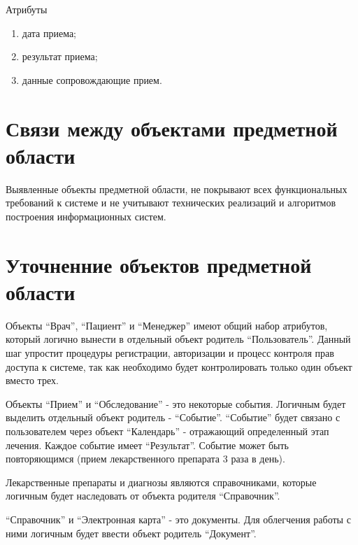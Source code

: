 Атрибуты
\begin{enumerate}
  \item дата приема; 
  \item результат приема; 
  \item данные сопровождающие прием. 
\end{enumerate}

\section{Связи между объектами предметной области}
Выявленные объекты предметной области, не покрывают всех функциональных
требований к системе и не учитывают технических реализаций и алгоритмов
построения информационных систем.

\section{Уточненние объектов предметной области}
Объекты “Врач”, “Пациент” и “Менеджер” имеют общий набор атрибутов, который
логично вынести в отдельный объект родитель “Пользователь”. Данный шаг упростит
процедуры регистрации, авторизации и процесс контроля прав доступа к системе,
так как необходимо будет контролировать только один объект вместо трех.

Объекты “Прием” и “Обследование” - это некоторые события. Логичным будет
выделить отдельный объект родитель - “Событие”. “Событие” будет связано с
пользователем через объект “Календарь” - отражающий определенный этап лечения.
Каждое событие имеет “Результат”. Событие может быть повторяющимся (прием
лекарственного препарата 3 раза в день). 

Лекарственные препараты и диагнозы являются справочниками, которые логичным
будет наследовать от объекта родителя “Справочник”.

“Справочник” и “Электронная карта” - это документы. Для облегчения работы с ними
логичным будет ввести объект родитель “Документ”.
 
 